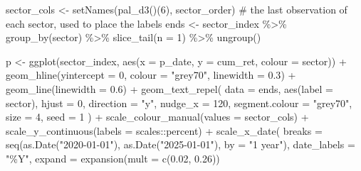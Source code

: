 \documentclass[
  12pt,
  letterpaper,
]{scrbook}
\newenvironment{Shaded}{\begin{snugshade}}{\end{snugshade}}
\newcommand{\AttributeTok}[1]{\textcolor[rgb]{0.40,0.45,0.13}{#1}}
\newcommand{\CommentTok}[1]{\textcolor[rgb]{0.37,0.37,0.37}{#1}}
\newcommand{\DecValTok}[1]{\textcolor[rgb]{0.68,0.00,0.00}{#1}}
\newcommand{\FloatTok}[1]{\textcolor[rgb]{0.68,0.00,0.00}{#1}}
\newcommand{\FunctionTok}[1]{\textcolor[rgb]{0.28,0.35,0.67}{#1}}
\newcommand{\NormalTok}[1]{\textcolor[rgb]{0.00,0.23,0.31}{#1}}
\newcommand{\OtherTok}[1]{\textcolor[rgb]{0.00,0.23,0.31}{#1}}
\newcommand{\SpecialCharTok}[1]{\textcolor[rgb]{0.37,0.37,0.37}{#1}}
\newcommand{\StringTok}[1]{\textcolor[rgb]{0.13,0.47,0.30}{#1}}
\theoremstyle{plain}
\theoremstyle{definition}
\theoremstyle{remark}
\begin{document}
\begin{Shaded}
\begin{Highlighting}[]
\NormalTok{sector\_cols }\OtherTok{\textless{}{-}} \FunctionTok{setNames}\NormalTok{(}\FunctionTok{pal\_d3}\NormalTok{()(}\DecValTok{6}\NormalTok{), sector\_order)}
\CommentTok{\# the last observation of each sector, used to place the labels}
\NormalTok{ends }\OtherTok{\textless{}{-}}\NormalTok{ sector\_index }\SpecialCharTok{\%\textgreater{}\%} \FunctionTok{group\_by}\NormalTok{(sector) }\SpecialCharTok{\%\textgreater{}\%} \FunctionTok{slice\_tail}\NormalTok{(}\AttributeTok{n =} \DecValTok{1}\NormalTok{) }\SpecialCharTok{\%\textgreater{}\%} \FunctionTok{ungroup}\NormalTok{()}

\NormalTok{p }\OtherTok{\textless{}{-}} \FunctionTok{ggplot}\NormalTok{(sector\_index, }\FunctionTok{aes}\NormalTok{(}\AttributeTok{x =}\NormalTok{ p\_date, }\AttributeTok{y =}\NormalTok{ cum\_ret, }\AttributeTok{colour =}\NormalTok{ sector)) }\SpecialCharTok{+}
     \FunctionTok{geom\_hline}\NormalTok{(}\AttributeTok{yintercept =} \DecValTok{0}\NormalTok{, }\AttributeTok{colour =} \StringTok{"grey70"}\NormalTok{, }\AttributeTok{linewidth =} \FloatTok{0.3}\NormalTok{) }\SpecialCharTok{+}
     \FunctionTok{geom\_line}\NormalTok{(}\AttributeTok{linewidth =} \FloatTok{0.6}\NormalTok{) }\SpecialCharTok{+}
     \FunctionTok{geom\_text\_repel}\NormalTok{(}
          \AttributeTok{data =}\NormalTok{ ends, }\FunctionTok{aes}\NormalTok{(}\AttributeTok{label =}\NormalTok{ sector), }\AttributeTok{hjust =} \DecValTok{0}\NormalTok{, }\AttributeTok{direction =} \StringTok{"y"}\NormalTok{,}
          \AttributeTok{nudge\_x =} \DecValTok{120}\NormalTok{, }\AttributeTok{segment.colour =} \StringTok{"grey70"}\NormalTok{, }\AttributeTok{size =} \DecValTok{4}\NormalTok{, }\AttributeTok{seed =} \DecValTok{1}
\NormalTok{     ) }\SpecialCharTok{+}
     \FunctionTok{scale\_colour\_manual}\NormalTok{(}\AttributeTok{values =}\NormalTok{ sector\_cols) }\SpecialCharTok{+}
     \FunctionTok{scale\_y\_continuous}\NormalTok{(}\AttributeTok{labels =}\NormalTok{ scales}\SpecialCharTok{::}\NormalTok{percent) }\SpecialCharTok{+}
     \FunctionTok{scale\_x\_date}\NormalTok{(}
          \AttributeTok{breaks =} \FunctionTok{seq}\NormalTok{(}\FunctionTok{as.Date}\NormalTok{(}\StringTok{"2020{-}01{-}01"}\NormalTok{), }\FunctionTok{as.Date}\NormalTok{(}\StringTok{"2025{-}01{-}01"}\NormalTok{), }\AttributeTok{by =} \StringTok{"1 year"}\NormalTok{),}
          \AttributeTok{date\_labels =} \StringTok{"\%Y"}\NormalTok{, }\AttributeTok{expand =} \FunctionTok{expansion}\NormalTok{(}\AttributeTok{mult =} \FunctionTok{c}\NormalTok{(}\FloatTok{0.02}\NormalTok{, }\FloatTok{0.26}\NormalTok{))}

\end{Highlighting}
\end{Shaded}
\end{document}
